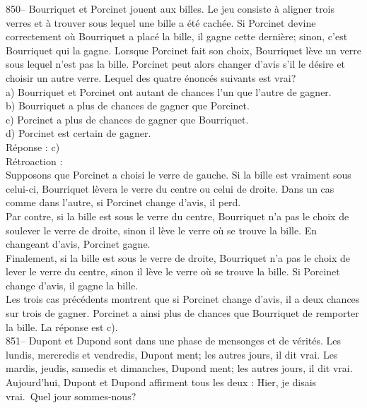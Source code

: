 ﻿\documentclass[letterpaper, 12pt]{article}
\begin{document}
850-- Bourriquet et Porcinet jouent aux billes.  Le jeu consiste \`a aligner
trois verres et \`a trouver sous lequel une bille a \'et\'e cach\'ee. Si
Porcinet devine correctement o\`u Bourriquet a plac\'e la bille, il gagne
cette derni\`ere; sinon, c'est Bourriquet qui la gagne.  Lorsque Porcinet
fait son choix, Bourriquet l\`eve un verre sous lequel n'est pas la bille.
Porcinet peut alors changer d'avis s'il le d\'esire et choisir un autre
verre.  Lequel des quatre \'enonc\'es suivants est vrai?\\
a) Bourriquet et Porcinet ont autant de chances l'un que l'autre de
gagner.\\
b) Bourriquet a plus de chances de gagner que Porcinet.\\
c) Porcinet a plus de chances de gagner que Bourriquet.\\
d) Porcinet est certain de gagner.\\

R\'eponse : c)\\

R\'etroaction : \\
Supposons que Porcinet a choisi le verre de gauche. Si la bille est vraiment
sous celui-ci, Bourriquet l\`evera le verre du centre ou celui de droite.
Dans un cas comme dans l'autre, si Porcinet change d'avis, il perd.  \\
Par contre, si la bille est sous le verre du centre, Bourriquet n'a pas le
choix de soulever le verre de droite, sinon il l\`eve le verre o\`u se
trouve la bille.  En changeant d'avis, Porcinet gagne.\\
Finalement, si la bille est sous le verre de droite, Bourriquet n'a pas le
choix de lever le verre du centre, sinon il l\`eve le verre o\`u se trouve
la bille.  Si Porcinet change d'avis, il gagne la bille.\\
Les trois cas pr\'ec\'edents montrent que si Porcinet change d'avis, il a
deux chances sur trois de gagner.  Porcinet a ainsi plus de chances que
Bourriquet de remporter la bille.  La r\'eponse est c).\\

851-- Dupont et Dupond sont dans une phase de mensonges et de v\'erit\'es.
Les lundis, mercredis et vendredis, Dupont ment; les autres jours, il dit
vrai.  Les mardis, jeudis, samedis et dimanches, Dupond ment; les autres
jours, il dit vrai.  Aujourd'hui, Dupont et Dupond affirment tous les deux :
\og Hier, je disais vrai.\fg\  Quel jour sommes-nous?\\
\end{document}
